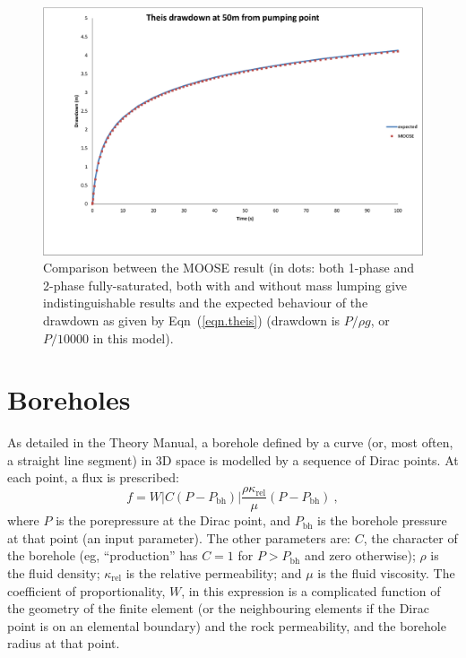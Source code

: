 \documentclass[]{scrreprt}
\begin{document}
\begin{figure}[htb]
\centering
\includegraphics[width=14cm]{th01.eps}
\caption{Comparison between the MOOSE result (in dots: both 1-phase
  and 2-phase fully-saturated, both with and without mass lumping give
  indistinguishable results and the
  expected behaviour of the drawdown as given by Eqn~(\ref{eqn.theis})
  (drawdown is $P/\rho g$, or $P/10000$ in this model).}
\label{th01.fig}
\end{figure}


\chapter{Boreholes}
\label{bh}

As detailed in the Theory Manual, a borehole defined by a curve (or,
most often, a straight line segment) in 3D space is modelled by a
sequence of Dirac points.  At each point, a flux is prescribed:
\begin{equation}
f = W|C(P-P_{\mathrm{bh}})| \frac{\rho \kappa_{\mathrm{rel}}}{\mu} (P - P_{\mathrm{bh}}) \ ,
\label{bh.propto.eqn}
\end{equation}
where $P$ is the porepressure at the Dirac point, and
$P_{\mathrm{bh}}$ is the borehole pressure at that point (an input
parameter).  The other parameters are: $C$, the character of the
borehole (eg, ``production'' has $C=1$ for $P>P_{\mathrm{bh}}$ and zero
otherwise); $\rho$ is the fluid density; $\kappa_{\mathrm{rel}}$ is
the relative permeability; and $\mu$ is the fluid viscosity.   The
coefficient of proportionality, $W$, in this expression is a
complicated function of the geometry of the finite element (or the
neighbouring elements if the Dirac point is on an elemental boundary)
and the rock permeability, and the borehole radius at that point.
\end{document}
